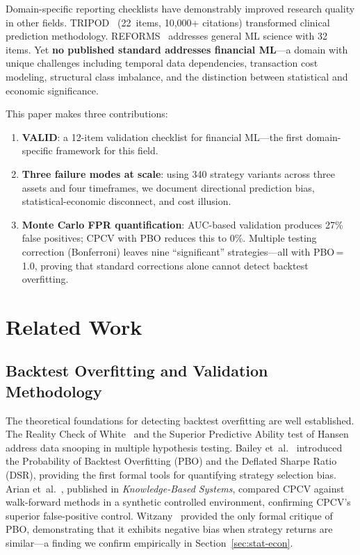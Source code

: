 \documentclass[sigconf,anonymous,review]{acmart}
\begin{document}
Domain-specific reporting checklists have demonstrably improved research
quality in other fields. TRIPOD~\cite{collins2015tripod} (22~items,
10{,}000+ citations) transformed clinical prediction methodology.
REFORMS~\cite{kapoor2024reforms} addresses general ML science with 32
items. Yet \textbf{no published standard addresses financial ML}---a
domain with unique challenges including temporal data dependencies,
transaction cost modeling, structural class imbalance, and the
distinction between statistical and economic significance.

This paper makes three contributions:

\begin{enumerate}
\item \textbf{VALID}: a 12-item validation checklist for financial
ML---the first domain-specific framework for this field.

\item \textbf{Three failure modes at scale}: using 340 strategy variants
across three assets and four timeframes, we document directional
prediction bias, statistical-economic disconnect, and cost illusion.

\item \textbf{Monte Carlo FPR quantification}: AUC-based validation
produces 27\% false positives; CPCV with PBO reduces this to 0\%.
Multiple testing correction (Bonferroni) leaves nine ``significant''
strategies---all with PBO\,=\,1.0, proving that standard corrections
alone cannot detect backtest overfitting.
\end{enumerate}


\section{Related Work}
\label{sec:related}

\subsection{Backtest Overfitting and Validation Methodology}

The theoretical foundations for detecting backtest overfitting are
well established. The Reality Check of White~\cite{white2000reality}
and the Superior Predictive Ability test of
Hansen~\cite{hansen2005test}
address data snooping in multiple hypothesis testing.
Bailey et~al.~\cite{bailey2017pbo} introduced the Probability of
Backtest Overfitting (PBO) and the Deflated Sharpe Ratio (DSR),
providing the first formal tools for quantifying strategy selection
bias. Arian et~al.~\cite{arian2024backtest}, published in
\emph{Knowledge-Based Systems}, compared CPCV against walk-forward
methods in a synthetic controlled environment, confirming CPCV's
superior false-positive control.
Witzany~\cite{witzany2021bayesian} provided the only formal critique
of PBO, demonstrating that it exhibits negative bias when strategy
returns are similar---a finding we confirm empirically in
Section~\ref{sec:stat-econ}.
\end{document}
